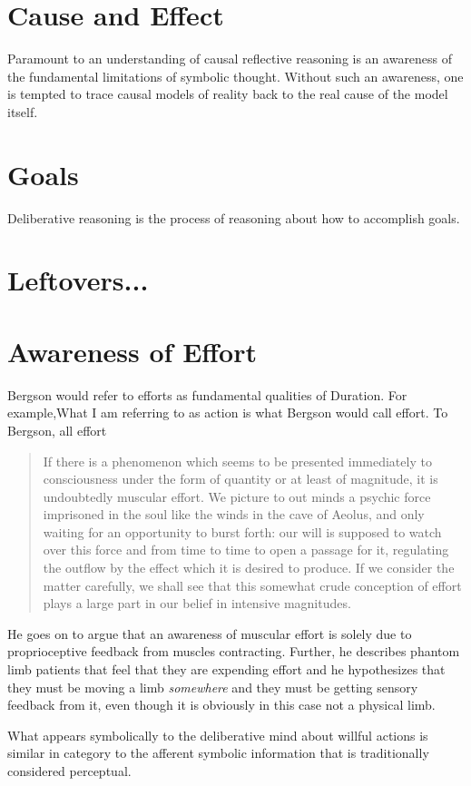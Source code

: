 \section{Cause and Effect}

Paramount to an understanding of causal reflective reasoning is an
awareness of the fundamental limitations of symbolic thought.  Without
such an awareness, one is tempted to trace causal models of reality
back to the real cause of the model itself.  

\section{Goals}

Deliberative reasoning is the process of reasoning about how to
accomplish goals.  



\section{Leftovers...}

\section{Awareness of Effort}

Bergson would refer to efforts as fundamental qualities of Duration.
For example,What I am referring to as action is what Bergson would
call effort.  To Bergson, all effort

\begin{quote}
If there is a phenomenon which seems to be presented immediately to
consciousness under the form of quantity or at least of magnitude, it
is undoubtedly muscular effort.  We picture to out minds a psychic
force imprisoned in the soul like the winds in the cave of Aeolus, and
only waiting for an opportunity to burst forth: our will is supposed
to watch over this force and from time to time to open a passage for
it, regulating the outflow by the effect which it is desired to
produce.  If we consider the matter carefully, we shall see that this
somewhat crude conception of effort plays a large part in our belief
in intensive magnitudes.
\end{quote}

He goes on to argue that an awareness of muscular effort is solely due
to proprioceptive feedback from muscles contracting.  Further, he
describes phantom limb patients that feel that they are expending
effort and he hypothesizes that they must be moving a limb
\emph{somewhere} and they must be getting sensory feedback from it,
even though it is obviously in this case not a physical limb.

What appears symbolically to the deliberative mind about willful
actions is similar in category to the afferent symbolic information
that is traditionally considered perceptual.







